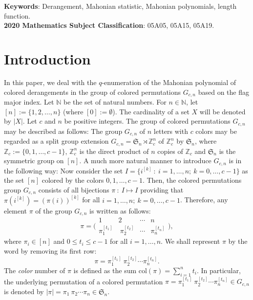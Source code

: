 \documentclass[a4paper,12pt]{article}
\begin{document}
\textbf{Keywords}:	Derangement, Mahonian
statistic, Mahonian polynomials, length function.\\

\textbf{2020 Mathematics Subject Classification}: 05A05, 05A15, 05A19.
\\
		
		
		
		\section{Introduction}
	In this paper, we deal with the $q$-enumeration of the Mahonian polynomial of colored derangements in the group of colored permutations $G_{c,n}$ based on the flag major index. Let $\mathbb{N}$ be the set of natural numbers. 
For $n\in\mathbb{N}$, let $[n]:=\{1,2,\ldots,n\}$ (where $[0]:=\emptyset$). 
The cardinality of a set $X$ will be denoted by $|X|$.
Let $c$ and $n$ be positive integers. The group of colored permutations $G_{c,n}$ may be described as follows:
The group $G_{c,n}$ of $n$ letters with $c$ colors may be regarded as a split group extension
$G_{c,n}=\mathfrak{S}_n \rtimes  \mathbb{Z}_c^n$ of $\mathbb{Z}_{c}^n$ by $\mathfrak{S}_n$, 
where $\mathbb{Z}_{c}:=\{0,1,\ldots,c-1\}$, $\mathbb{Z}_{c}^n$ is the direct product of $n$ copies of 
$\mathbb{Z}_c$ and $\mathfrak{S}_n$ is the symmetric group on $[n]$.
A much more natural manner to introduce $G_{c,n}$ is in the following way: 
Now consider the set $I=\{ i^{[k]}~:~i=1, \ldots, n; ~k= 0, \ldots, c-1\}$ as the set $[n]$ colored by the colors $0,1,\ldots, c-1$.
Then, the colored permutations group $G_{c,n}$ 
consists of all bijections $\pi~:~I \mapsto I$ providing that $\pi(i^{[k]} )=(\pi(i))^{[k]}$ 
for all $i=1, \ldots, n; ~k=0, \ldots,c-1$. 
Therefore, any element $\pi$ of the group $G_{c,n}$ is written as follows:
$$
\pi = \bigl(\begin{smallmatrix}
	1 & 2 &  \cdots  & n \\
	\pi_1^{[t_1]} & ~\pi_2^{[t_2]}& \cdots   &  \pi_n^{[t_n]}
\end{smallmatrix}\bigr),
$$
where $\pi_i\in [n]$ and $0\leq t_i \leq c-1$ for all $i=1,\ldots,n$. We shall represent $\pi$ by the word by removing its first row:
$$\pi=\pi_1^{[t_1]} ~\pi_2^{[t_2]} \cdots  \pi_n^{[t_n]}.$$
The \textit{color} number of $\pi$ is defined as the sum $\textrm{col}(\pi)=\sum_{i=1}^n t_{i}$. In particular, the underlying permutation of a colored permutation $\pi=\pi_1^{[t_1]} ~\pi_2^{[t_2]} \cdots  \pi_n^{[t_n]} \in G_{c,n}$
is denoted by $|\pi|=\pi_1 ~\pi_2 \cdots  \pi_n \in \mathfrak{S}_n$.
\end{document}
